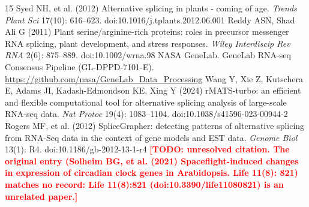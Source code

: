 \documentclass[12pt,a4paper]{article}
\newcommand{\TODO}[1]{\textcolor{red}{\textbf{[TODO: #1]}}}
\begin{document}
\begin{thebibliography}{15}
 Syed NH, et al. (2012) Alternative splicing in plants - coming of age. \textit{Trends Plant Sci} 17(10): 616--623. doi:10.1016/j.tplants.2012.06.001
 Reddy ASN, Shad Ali G (2011) Plant serine/arginine-rich proteins: roles in precursor messenger RNA splicing, plant development, and stress responses. \textit{Wiley Interdiscip Rev RNA} 2(6): 875--889. doi:10.1002/wrna.98
 NASA GeneLab. GeneLab RNA-seq Consensus Pipeline (GL-DPPD-7101-E). \url{https://github.com/nasa/GeneLab_Data_Processing}
 Wang Y, Xie Z, Kutschera E, Adams JI, Kadash-Edmondson KE, Xing Y (2024) rMATS-turbo: an efficient and flexible computational tool for alternative splicing analysis of large-scale RNA-seq data. \textit{Nat Protoc} 19(4): 1083--1104. doi:10.1038/s41596-023-00944-2
 Rogers MF, et al. (2012) SpliceGrapher: detecting patterns of alternative splicing from RNA-Seq data in the context of gene models and EST data. \textit{Genome Biol} 13(1): R4. doi:10.1186/gb-2012-13-1-r4
 \TODO{unresolved citation. The original entry (Solheim BG, et al. (2021) Spaceflight-induced changes in expression of circadian clock genes in Arabidopsis. Life 11(8): 821) matches no record: Life 11(8):821 (doi:10.3390/life11080821) is an unrelated paper.}
\end{thebibliography}
\end{document}
